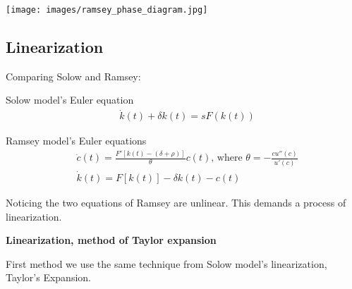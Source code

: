 \documentclass{article}
\begin{document}
\texttt{[image: images/ramsey\_phase\_diagram.jpg]}



\subsection{Linearization} 

Comparing Solow and Ramsey:

Solow model's Euler equation 
\begin{align}
&\dot k(t)+\delta k(t)=sF(k(t))
\end{align}

Ramsey model's Euler equations 
\begin{align}
& \dot c(t)=\frac{F'[k(t)-(\delta+\rho)]}{\theta} c(t)\text{, where } \theta=-\frac{c u''(c)}{u'(c)}
\\& \dot k(t)=F[k(t)]-\delta k(t)-c(t)
\end{align}

Noticing the two equations of Ramsey are unlinear. This demands a process of linearization.

\textbf{Linearization, method of Taylor expansion}

First method we use the same technique from Solow model's linearization, Taylor's Expansion.
\end{document}
